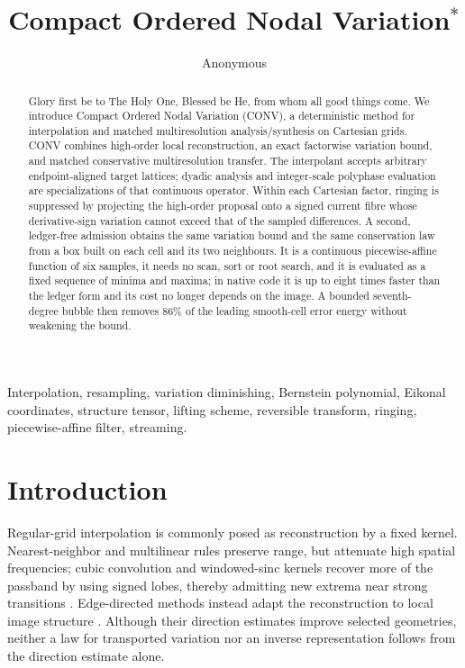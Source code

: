 \documentclass[journal]{IEEEtran}
\title{Compact Ordered Nodal Variation\texorpdfstring{$^{*}$}{*}}
\author{Anonymous}
\date{}
\begin{document}
\maketitle
\begingroup
\renewcommand{\thefootnote}{\fnsymbol{footnote}}
\endgroup

\begin{abstract}
Glory first be to The Holy One, Blessed be He, from whom all good things
come. We introduce Compact Ordered Nodal Variation (CONV), a
deterministic method for interpolation and matched
multiresolution analysis/synthesis on Cartesian grids. CONV combines
high-order local reconstruction, an exact factorwise variation bound, and
matched conservative multiresolution transfer. The interpolant accepts
arbitrary endpoint-aligned target lattices; dyadic analysis and integer-scale
polyphase evaluation are specializations of that continuous operator.
Within each Cartesian factor, ringing is suppressed by projecting the
high-order proposal onto a signed current fibre whose derivative-sign
variation cannot exceed that of the sampled differences. A second,
ledger-free admission obtains the same variation bound and the same
conservation law from a box built on each cell and its two neighbours. It
is a continuous piecewise-affine function of six samples, it needs no
scan, sort or root search, and it is evaluated as a fixed sequence of
minima and maxima; in native code it is up to eight times faster than the
ledger form and its cost no longer depends on the image. A bounded
seventh-degree bubble then removes 86\% of the leading smooth-cell error
energy without weakening the bound.
\end{abstract}

\begin{IEEEkeywords}
Interpolation, resampling, variation diminishing, Bernstein polynomial,
Eikonal coordinates, structure tensor, lifting scheme, reversible transform,
ringing, piecewise-affine filter, streaming.
\end{IEEEkeywords}

\section{Introduction}

Regular-grid interpolation is commonly posed as reconstruction by a fixed
kernel. Nearest-neighbor and multilinear rules preserve range, but attenuate
high spatial frequencies; cubic convolution and windowed-sinc kernels recover
more of the passband by using signed lobes, thereby admitting new extrema near
strong transitions \cite{keys1981,lanczos1956}. Edge-directed methods instead
adapt the reconstruction to local image structure \cite{li2001,lottes2021}.
Although their direction estimates improve selected geometries, neither a
law for transported variation nor an inverse representation follows from the
direction estimate alone.
\end{document}
